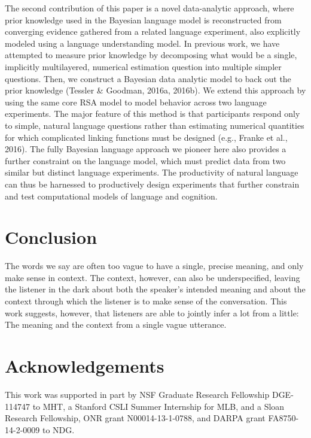 \documentclass[doc]{apa6}
\begin{document}
The second contribution of this paper is a novel data-analytic approach,
where prior knowledge used in the Bayesian language model is
reconstructed from converging evidence gathered from a related language
experiment, also explicitly modeled using a language understanding
model. In previous work, we have attempted to measure prior knowledge by
decomposing what would be a single, implicitly multilayered, numerical
estimation question into multiple simpler questions. Then, we construct
a Bayesian data analytic model to back out the prior knowledge (Tessler
\& Goodman, 2016a, 2016b). We extend this approach by using the same
core RSA model to model behavior across two language experiments. The
major feature of this method is that participants respond only to
simple, natural language questions rather than estimating numerical
quantities for which complicated linking functions must be designed
(e.g., Franke et al., 2016). The fully Bayesian language approach we
pioneer here also provides a further constraint on the language model,
which must predict data from two similar but distinct language
experiments. The productivity of natural language can thus be harnessed
to productively design experiments that further constrain and test
computational models of language and cognition.

\section{Conclusion}

The words we say are often too vague to have a single, precise meaning,
and only make sense in context. The context, however, can also be
underspecified, leaving the listener in the dark about both the
speaker's intended meaning and about the context through which the
listener is to make sense of the conversation. This work suggests,
however, that listeners are able to jointly infer a lot from a little:
The meaning and the context from a single vague utterance.


\section{Acknowledgements}

This work was supported in part by NSF Graduate Research Fellowship
DGE-114747 to MHT, a Stanford CSLI Summer Internship for MLB, and a
Sloan Research Fellowship, ONR grant N00014-13-1-0788, and DARPA grant
FA8750-14-2-0009 to NDG.

\newpage
\end{document}
